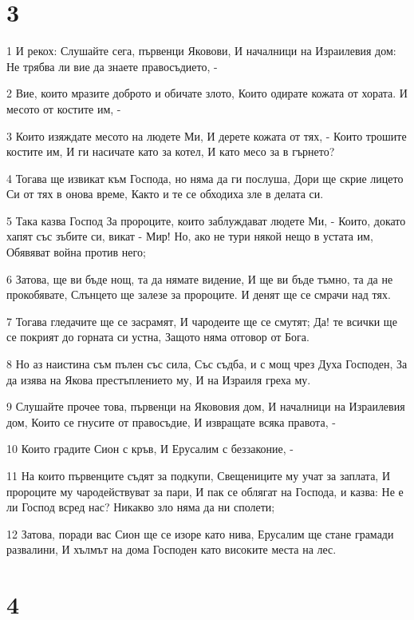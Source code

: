 \chapter{3}

\par 1 И рекох: Слушайте сега, първенци Яковови, И началници на Израилевия дом: Не трябва ли вие да знаете правосъдието, -
\par 2 Вие, които мразите доброто и обичате злото, Които одирате кожата от хората. И месото от костите им, -
\par 3 Които изяждате месото на людете Ми, И дерете кожата от тях, - Които трошите костите им, И ги насичате като за котел, И като месо за в гърнето?
\par 4 Тогава ще извикат към Господа, но няма да ги послуша, Дори ще скрие лицето Си от тях в онова време, Както и те се обходиха зле в делата си.
\par 5 Така казва Господ За пророците, които заблуждават людете Ми, - Които, докато хапят със зъбите си, викат - Мир! Но, ако не тури някой нещо в устата им, Обявяват война против него;
\par 6 Затова, ще ви бъде нощ, та да нямате видение, И ще ви бъде тъмно, та да не прокобявате, Слънцето ще залезе за пророците. И денят ще се смрачи над тях.
\par 7 Тогава гледачите ще се засрамят, И чародеите ще се смутят; Да! те всички ще се покрият до горната си устна, Защото няма отговор от Бога.
\par 8 Но аз наистина съм пълен със сила, Със съдба, и с мощ чрез Духа Господен, За да изява на Якова престъплението му, И на Израиля греха му.
\par 9 Слушайте прочее това, първенци на Якововия дом, И началници на Израилевия дом, Които се гнусите от правосъдие, И извращате всяка правота, -
\par 10 Които градите Сион с кръв, И Ерусалим с беззаконие, -
\par 11 На които първенците съдят за подкупи, Свещениците му учат за заплата, И пророците му чародействуват за пари, И пак се облягат на Господа, и казва: Не е ли Господ всред нас? Никакво зло няма да ни сполети;
\par 12 Затова, поради вас Сион ще се изоре като нива, Ерусалим ще стане грамади развалини, И хълмът на дома Господен като високите места на лес.

\chapter{4}

